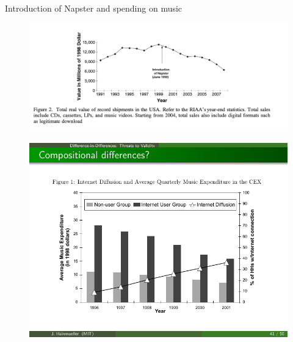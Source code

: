 \documentclass{beamer}
\begin{document}
\begin{frame}{Introduction of Napster and spending on music}
	\begin{figure}
	\includegraphics[scale=0.5]{./lecture_includes/hong_napster}
	\end{figure}
	
\end{frame}


\begin{frame}[plain]
	\begin{figure}
	\includegraphics{./lecture_includes/Hong_1.pdf}
	\end{figure}
	
\end{frame}
\end{document}
